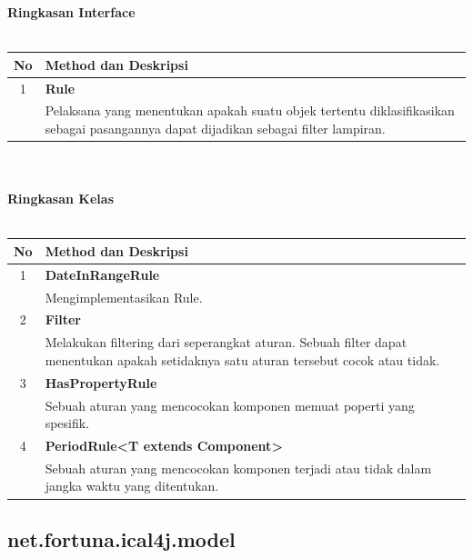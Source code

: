 \noindent \textbf{Ringkasan Interface}\cite{ical}\\ \\
	\begin{tabular}{|c|p{12cm}|}
		\hline
		\textbf{No} & \textbf{Method dan Deskripsi} \\ \hline \hline
		1 & \textbf{Rule}\\
			&	Pelaksana yang menentukan apakah suatu objek tertentu diklasifikasikan sebagai pasangannya dapat dijadikan sebagai filter lampiran.\\ \hline
	\end{tabular}
	\\ \\
	\noindent \textbf{Ringkasan Kelas}\cite{ical}\\ \\
	\begin{tabular}{|c|p{12cm}|}
		\hline
		\textbf{No} & \textbf{Method dan Deskripsi} \\ \hline \hline
		1 & \textbf{DateInRangeRule}\\
			&	Mengimplementasikan Rule.\\ \hline
		2 & \textbf{Filter}\\
			&	Melakukan filtering dari seperangkat aturan. Sebuah filter dapat menentukan apakah setidaknya satu aturan tersebut cocok atau tidak. \\ \hline
		3 & \textbf{HasPropertyRule}\\
			&	Sebuah aturan yang mencocokan komponen memuat poperti yang spesifik.\\ \hline
		4 & \textbf{PeriodRule<T extends Component>	
}\\
			&	Sebuah aturan yang mencocokan komponen terjadi atau tidak dalam jangka waktu yang ditentukan.\\ \hline
	\end{tabular}
	
\subsection{net.fortuna.ical4j.model}

